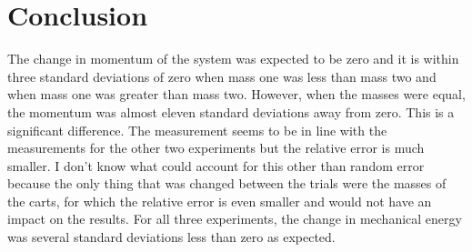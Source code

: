 \documentclass[12pt]{article}
\begin{document}
    \section{Conclusion}
        The change in momentum of the system was expected to be zero and it is within three standard deviations of zero when mass one was less than mass two and when mass one was greater than mass two. However, when the masses were equal, the momentum was almost eleven standard deviations away from zero. This is a significant difference. The measurement seems to be in line with the measurements for the other two experiments but the relative error is much smaller. I don't know what could account for this other than random error because the only thing that was changed between the trials were the masses of the carts, for which the relative error is even smaller and would not have an impact on the results. For all three experiments, the change in mechanical energy was several standard deviations less than zero as expected.
\end{document}
